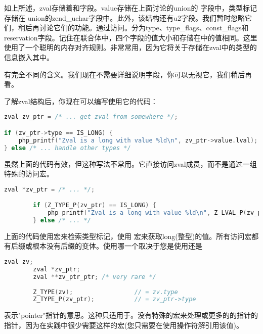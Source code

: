 如上所述，zval存储着和字段。value存储在上面讨论的union的  字段中，类型标记存储在 union的zend\_uchar字段中。此外，该结构还有u2字段。我们暂时忽略它们，稍后再讨论它们的功能。通过访问。分为type、type\_flags、const\_flags和reservation字段。记住在联合体中，四个字段的值大小和存储在中的值相同。这里使用了一个聪明的内存对齐规则。非常常用，因为它将关于存储在zval中的类型的信息嵌入其中。

有完全不同的含义。我们现在不需要详细说明字段，你可以无视它，我们稍后再看。

了解zval结构后，你现在可以编写使用它的代码：

\begin{lstlisting}[language=c]
zval zv_ptr = /* ... get zval from somewhere */;

if (zv_ptr->type == IS_LONG) {
    php_printf("Zval is a long with value %ld\n", zv_ptr->value.lval);
} else /* ... handle other types */
\end{lstlisting}


虽然上面的代码有效，但这种写法不常用。它直接访问zval成员，而不是通过一组特殊的访问宏。

\begin{lstlisting}[language=c]
        zval *zv_ptr = /* ... */;

        if (Z_TYPE_P(zv_ptr) == IS_LONG) {
            php_printf("Zval is a long with value %ld\n", Z_LVAL_P(zv_ptr));
        } else /* ... */        
\end{lstlisting}

上面的代码使用宏来检索类型标记，使用 宏来获取long(整型)的值。所有访问宏都有后缀或根本没有后缀的变体。使用哪一个取决于您是使用还是

\begin{lstlisting}[language=c]
        zval zv;
        zval *zv_ptr;
        zval **zv_ptr_ptr; /* very rare */
        
        Z_TYPE(zv);                 // = zv.type
        Z_TYPE_P(zv_ptr);           // = zv_ptr->type        
\end{lstlisting}


表示"pointer"指针的意思。这种只适用于。没有特殊的宏来处理或更多的的指针的指针，因为在实践中很少需要这样的宏(您只需要在使用\code{*}操作符解引用该值)。

